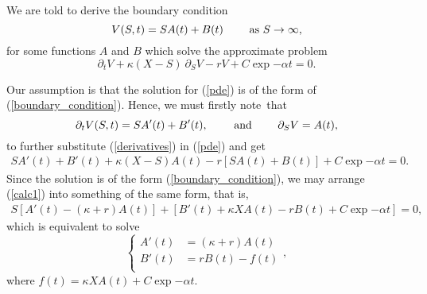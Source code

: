 	
\noindent We are told to derive the boundary condition 
\begin{equation}\label{boundary_condition}
	V(S, t) = S A(t) + B(t) \quad\quad \text{ as } S\to \infty,
\end{equation}
for some functions $A$ and $B$ which solve the approximate problem
\begin{equation}\label{pde}
	\partial_t V + \kappa (X - S) \ \partial_S V - rV + C \exp{-\alpha t} = 0.
\end{equation}

Our assumption is that the solution for (\ref{pde}) is of the form of (\ref{boundary_condition}). Hence, we must firstly note~that
\begin{equation}\label{derivatives}
	\partial_t V (S, t) = S A'(t) + B'(t), \quad\quad \text{ and } \quad\quad \partial_S V = A(t),
\end{equation}
to further substitute (\ref{derivatives}) in (\ref{pde}) and get
\begin{equation}\label{calc1}
	\begin{aligned}
		S A'(t) + B'(t) + \kappa (X - S) A(t) - r \left[ S A(t) + B(t)\right] + C\exp{-\alpha t} = 0.
	\end{aligned}
\end{equation}
Since the solution is of the form (\ref{boundary_condition}), we may arrange (\ref{calc1}) into something of the same form, that is,
\begin{equation}\label{calc2}
	\begin{aligned}
		S \left[A'(t) - (\kappa + r) A(t) \right] + \left[ B'(t) + \kappa X A(t) - rB(t) + C\exp{-\alpha t}\right] = 0,
	\end{aligned}
\end{equation}
which is equivalent to solve
\begin{equation}
	\begin{cases}
		A'(t) &=  (\kappa + r) A(t) \\
		B'(t) &= rB(t)  - f(t) \\
	\end{cases},
\end{equation}
where $f(t) = \kappa X A(t) + C\exp{-\alpha t}$.

